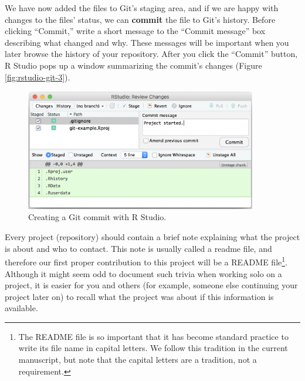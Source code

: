 \documentclass[
  american,
  ,doc,floatsintext]{apa6}
\begin{document}
We have now added the files to Git's staging area, and if we are happy with changes to the files' status, we can \textbf{commit} the file to Git's history. Before clicking ``Commit,'' write a short message to the ``Commit message'' box describing what changed and why. These messages will be important when you later browse the history of your repository. After you click the ``Commit'' button, R Studio pops up a window summarizing the commit's changes (Figure \ref{fig:rstudio-git-3}).

\begin{figure}

{\centering \includegraphics[width=3.98in]{images/rstudio-git-2} 

}

\caption{Creating a Git commit with R Studio.}\label{fig:rstudio-git-2}
\end{figure}

Every project (repository) should contain a brief note explaining what the project is about and who to contact. This note is usually called a readme file, and therefore our first proper contribution to this project will be a README file\footnote{The README file is so important that it has become standard practice to write its file name in capital letters. We follow this tradition in the current manuscript, but note that the capital letters are a tradition, not a requirement.}. Although it might seem odd to document such trivia when working solo on a project, it is easier for you and others (for example, someone else continuing your project later on) to recall what the project was about if this information is available.
\end{document}
